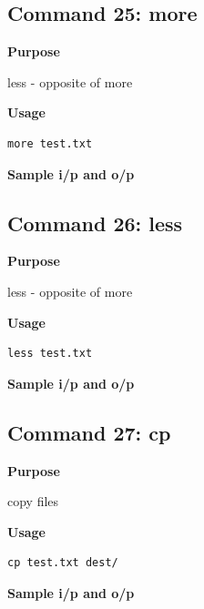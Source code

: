 \documentclass{article}
\begin{document}
\subsection{Command 25: more} 
\textbf{Purpose}
\begin{flushleft}
       less - opposite of more
\end{flushleft}
\textbf{Usage}
\begin{verbatim}
more test.txt
\end{verbatim}
\textbf{Sample i/p and o/p}
\begin{figure}[H] 
\end{figure}
\subsection{Command 26: less} 
\textbf{Purpose}
\begin{flushleft}
       less - opposite of more
\end{flushleft}
\textbf{Usage}
\begin{verbatim}
less test.txt
\end{verbatim}
\textbf{Sample i/p and o/p}
\begin{figure}[H] 
\end{figure}
\subsection{Command 27: cp} 
\textbf{Purpose}
\begin{flushleft}
 copy files
\end{flushleft}
\textbf{Usage}
\begin{verbatim}
cp test.txt dest/
\end{verbatim}
\textbf{Sample i/p and o/p}
\begin{figure}[H] 
\end{figure}
\end{document}
